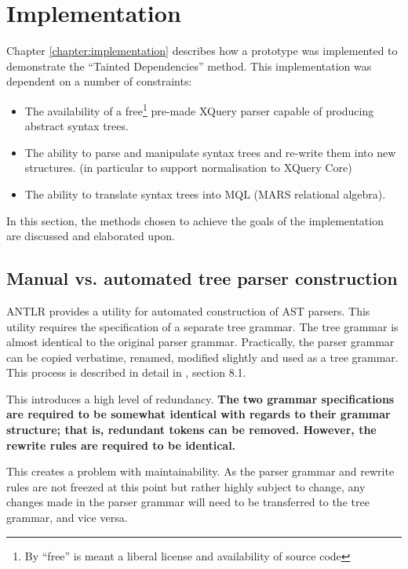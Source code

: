 \section{Implementation}
\label{sect:disc:contextSens}
Chapter \ref{chapter:implementation} describes how a prototype was implemented
to demonstrate the ``Tainted Dependencies'' method. This implementation
was dependent on a number of constraints:
\begin{itemize}
  \item The availability of a free\footnote{By ``free'' is meant a liberal
  license and availability of source code} pre-made XQuery parser capable of
  producing abstract syntax trees.
  \item The ability to parse and manipulate syntax trees and re-write them into
  new structures. (in particular to support normalisation to XQuery Core) 
  \item The ability to translate syntax trees into MQL (MARS relational algebra).
\end{itemize}

In this section, the methods chosen to achieve the goals of the implementation
are discussed and elaborated upon.

\subsection{Manual vs. automated tree parser construction}
ANTLR provides a utility for automated construction of AST parsers. This
utility requires the specification of a separate tree grammar. The tree
grammar is almost identical to the original parser grammar. Practically, the
parser grammar can be copied verbatime, renamed, modified slightly and used as
a tree  grammar. This process is described in detail in \cite{definitiveAntlr},
section 8.1.

This introduces a high level of redundancy. \textbf{The two grammar
specifications are required to be somewhat identical with regards to their grammar structure; that
is,  redundant tokens can be removed. However, the rewrite rules are required to
be identical.}

This creates a problem with maintainability. As the parser grammar and rewrite
rules are not freezed at this point but rather highly subject to change, any
changes made in the parser grammar will need to be transferred to the tree
grammar, and vice versa. 


